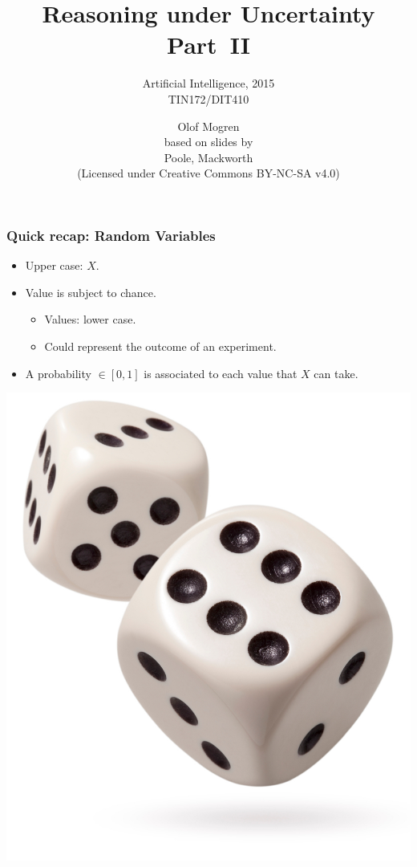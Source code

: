 \documentclass[12pt]{beamer} %
\title{Reasoning under Uncertainty Part~II}
\subtitle{Artificial Intelligence, 2015\\ TIN172/DIT410} %
\author[Olof Mogren]{Olof Mogren\\ \tiny{based on slides by\\ Poole, Mackworth\\ (Licensed under Creative Commons BY-NC-SA v4.0)}} %
\institute{Chalmers University of Technology}
\begin{document}
\begin{frame}[plain]
 \titlepage
\end{frame}

\begin{frame}
\frametitle{Quick recap: Random Variables}
\begin{itemize}
\item Upper case: $X$.
\item Value is subject to chance.
\begin{itemize}
\item Values: lower case.
\item Could represent the outcome of an experiment.
\end{itemize}
\item A probability $\in [0,1]$ is associated to each value that $X$ can take.
\end{itemize}
\begin{center}
\includegraphics[width=0.3\columnwidth]{figures/uncert_fig_dice1.jpg}
\end{center}
\end{frame}
\end{document}
